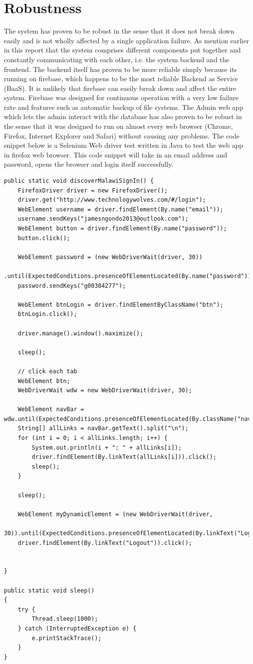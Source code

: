 \section{Robustness}
The system has proven to be robust in the sense that it does not break down easily and is not wholly affected by a single application failure. As mention earlier in this report that the system comprises different components put together and constantly communicating with each other, i.e. the system backend and the frontend. The backend itself has proven to be more reliable simply because its running on firebase, which happens to be the most reliable Backend as  Service (BaaS). It is unlikely that firebase can easily break down and affect the entire system. Firebase was designed for continuous operation with a very low failure rate and features such as automatic backup of file systems. The Admin web app \cite{hosting24} which lets the admin interact with the database has also proven to be robust in the sense that it was designed to run on almost every web browser (Chrome, Firefox, Internet Explorer and Safari) without causing any problems. 
The code snippet below is a Selenium Web driver test written in Java to test the web app in firefox web browser. This code snippet will take in an email address and password, opens the browser and login itself successfully.
\begin{verbatim}
public static void discoverMalawiSignIn() {
	FirefoxDriver driver = new FirefoxDriver();
	driver.get("http://www.technologywolves.com/#/login");
	WebElement username = driver.findElement(By.name("email"));
	username.sendKeys("jamesngondo2013@outlook.com");
	WebElement button = driver.findElement(By.name("password"));
	button.click();
	
	WebElement password = (new WebDriverWait(driver, 30))
	.until(ExpectedConditions.presenceOfElementLocated(By.name("password")));
	password.sendKeys("g00304277");
	
	WebElement btnLogin = driver.findElementByClassName("btn");
	btnLogin.click();
	
	driver.manage().window().maximize();
	
	sleep();
	
	// click each tab
	WebElement btn;
	WebDriverWait wdw = new WebDriverWait(driver, 30);
	
	WebElement navBar = wdw.until(ExpectedConditions.presenceOfElementLocated(By.className("nav")));
	String[] allLinks = navBar.getText().split("\n");
	for (int i = 0; i < allLinks.length; i++) {
		System.out.println(i + ": " + allLinks[i]);
		driver.findElement(By.linkText(allLinks[i])).click();
		sleep();
	}
	
	sleep();
	
	WebElement myDynamicElement = (new WebDriverWait(driver,
	30)).until(ExpectedConditions.presenceOfElementLocated(By.linkText("Logout")));
	driver.findElement(By.linkText("Logout")).click();
	
	
}
	
public static void sleep()
{
	try {
		Thread.sleep(1000);
	} catch (InterruptedException e) {
		e.printStackTrace();
	}
}
\end{verbatim}

